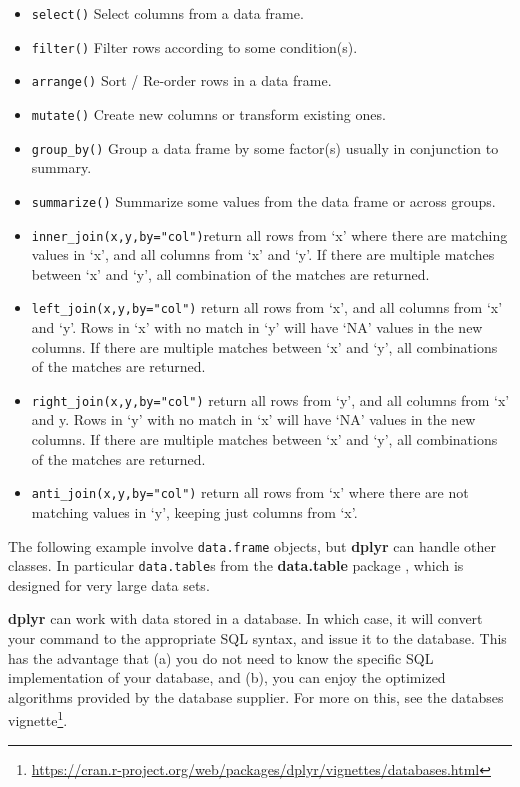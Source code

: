 \documentclass[]{book}
\providecommand{\tightlist}{%
  \setlength{\itemsep}{0pt}\setlength{\parskip}{0pt}}
\renewcommand{\href}[2]{#2\footnote{\url{#1}}}
\theoremstyle{definition}
\theoremstyle{definition}
\theoremstyle{definition}
\theoremstyle{remark}
\begin{document}
\begin{itemize}
\tightlist
\item
  \texttt{select()} Select columns from a data frame.
\item
  \texttt{filter()} Filter rows according to some condition(s).
\item
  \texttt{arrange()} Sort / Re-order rows in a data frame.
\item
  \texttt{mutate()} Create new columns or transform existing ones.
\item
  \texttt{group\_by()} Group a data frame by some factor(s) usually in conjunction to summary.
\item
  \texttt{summarize()} Summarize some values from the data frame or across groups.
\item
  \texttt{inner\_join(x,y,by="col")}return all rows from `x' where there are matching values in `x', and all columns from `x' and `y'. If there are multiple matches between `x' and `y', all combination of the matches are returned.
\item
  \texttt{left\_join(x,y,by="col")} return all rows from `x', and all columns from `x' and `y'. Rows in `x' with no match in `y' will have `NA' values in the new columns. If there are multiple matches between `x' and `y', all combinations of the matches are returned.
\item
  \texttt{right\_join(x,y,by="col")} return all rows from `y', and all columns from `x' and y. Rows in `y' with no match in `x' will have `NA' values in the new columns. If there are multiple matches between `x' and `y', all combinations of the matches are returned.
\item
  \texttt{anti\_join(x,y,by="col")} return all rows from `x' where there are not matching values in `y', keeping just columns from `x'.
\end{itemize}

The following example involve \texttt{data.frame} objects, but \textbf{dplyr} can handle other classes.
In particular \texttt{data.table}s from the \textbf{data.table} package \citep{datatable}, which is designed for very large data sets.

\textbf{dplyr} can work with data stored in a database.
In which case, it will convert your command to the appropriate SQL syntax, and issue it to the database.
This has the advantage that (a) you do not need to know the specific SQL implementation of your database, and (b), you can enjoy the optimized algorithms provided by the database supplier.
For more on this, see the \href{https://cran.r-project.org/web/packages/dplyr/vignettes/databases.html}{databses vignette}.
\end{document}
